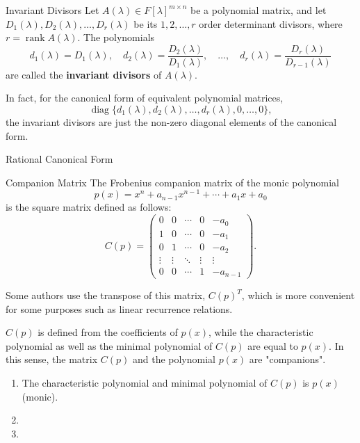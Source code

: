 \documentclass[11pt]{../../TexTemplate/elegantbook} %
\begin{document}
\begin{definition}{Invariant Divisors}
    Let \( A(\lambda) \in F[\lambda]^{m \times n} \) be a polynomial matrix,
    and let \( D_1(\lambda), D_2(\lambda), \dots, D_r(\lambda) \) be its \( 1, 2, \dots, r \) order determinant divisors,
    where \( r = \operatorname{rank} A(\lambda) \).
    The polynomials
    \[
    d_1(\lambda) = D_1(\lambda), \quad
    d_2(\lambda) = \frac{D_2(\lambda)}{D_1(\lambda)}, \quad
    \dots, \quad
    d_r(\lambda) = \frac{D_r(\lambda)}{D_{r-1}(\lambda)}
    \]
    are called the \textbf{invariant divisors} of \( A(\lambda) \).
\end{definition}
\begin{note}
    In fact, for the canonical form of equivalent polynomial matrices,
    \[
    \operatorname{diag}\{ d_{1}(\lambda), d_{2}(\lambda), \ldots, d_{r}(\lambda), 0, \ldots, 0 \},
    \]
    the invariant divisors are just the non-zero diagonal elements of the canonical form.
\end{note}


\begin{leftbarTitle}{Rational Canonical Form}\end{leftbarTitle}
\begin{definition}{Companion Matrix}
    The Frobenius companion matrix of the monic polynomial
    \[
    p(x) = x^n + a_{n-1}x^{n-1} + \cdots + a_1 x + a_0
    \]
    is the square matrix defined as follows:
    \[
    C(p) = \begin{pmatrix}
    0 & 0 & \cdots & 0 & -a_0 \\
    1 & 0 & \cdots & 0 & -a_1 \\
    0 & 1 & \cdots & 0 & -a_2 \\
    \vdots & \vdots & \ddots & \vdots & \vdots \\
    0 & 0 & \cdots & 1 & -a_{n-1}
    \end{pmatrix}.
    \]
\end{definition}

Some authors use the transpose of this matrix, \(C(p)^{T}\), 
which is more convenient for some purposes such as linear recurrence relations.

\(C(p)\) is defined from the coefficients of \(p(x)\), 
while the characteristic polynomial as well as the minimal polynomial of \(C(p)\) are equal to \(p(x)\). 
In this sense, the matrix \(C(p)\) and the polynomial \(p(x)\) are "companions".

\begin{property}
    \begin{enumerate}
        \item The characteristic polynomial and minimal polynomial of \( C(p) \) is \( p(x) \) (monic).
        \item  
        \item 
    \end{enumerate}
\end{property}
\end{document}

